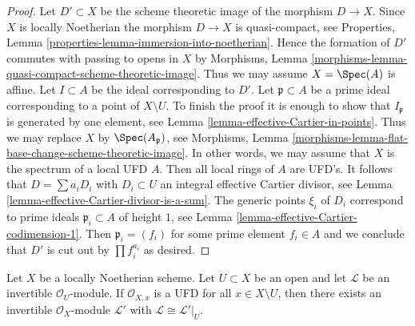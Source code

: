 \begin{proof}
Let $D' \subset X$ be the scheme theoretic image of the morphism $D \to X$.
Since $X$ is locally Noetherian the morphism $D \to X$ is quasi-compact, see
Properties, Lemma \ref{properties-lemma-immersion-into-noetherian}.
Hence the formation of $D'$ commutes with passing to opens in $X$ by
Morphisms, Lemma \ref{morphisms-lemma-quasi-compact-scheme-theoretic-image}.
Thus we may assume $X = \Spec(A)$ is affine.
Let $I \subset A$ be the ideal corresponding to $D'$.
Let $\mathfrak p \subset A$ be a prime ideal corresponding to a point
of $X \setminus U$.
To finish the proof it is enough to show that $I_\mathfrak p$ is generated
by one element, see Lemma \ref{lemma-effective-Cartier-in-points}.
Thus we may replace $X$ by $\Spec(A_\mathfrak p)$, see
Morphisms, Lemma \ref{morphisms-lemma-flat-base-change-scheme-theoretic-image}.
In other words, we may assume that $X$ is the spectrum of a local
UFD $A$. Then all local rings of $A$ are UFD's. It follows that
$D = \sum a_i D_i$ with $D_i \subset U$ an integral effective Cartier divisor,
see Lemma \ref{lemma-effective-Cartier-divisor-is-a-sum}.
The generic points $\xi_i$ of $D_i$ correspond to prime ideals
$\mathfrak p_i \subset A$ of height $1$, see
Lemma \ref{lemma-effective-Cartier-codimension-1}.
Then $\mathfrak p_i = (f_i)$ for some prime element $f_i \in A$
and we conclude that $D'$ is cut out by $\prod f_i^{a_i}$ as desired.
\end{proof}

\begin{lemma}
\label{lemma-extend-invertible-module}
Let $X$ be a locally Noetherian scheme. Let $U \subset X$ be
an open and let $\mathcal{L}$ be an invertible $\mathcal{O}_U$-module.
If $\mathcal{O}_{X, x}$ is a UFD for all $x \in X \setminus U$,
then there exists an invertible $\mathcal{O}_X$-module $\mathcal{L}'$
with $\mathcal{L} \cong \mathcal{L}'|_U$.
\end{lemma}

